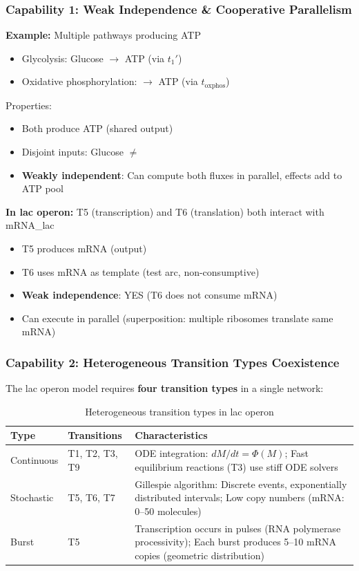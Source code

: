 \subsubsection{Capability 1: Weak Independence \& Cooperative Parallelism}

\textbf{Example:} Multiple pathways producing ATP
\begin{itemize}
    \item Glycolysis: Glucose $\to$ ATP (via $t_1'$)
    \item Oxidative phosphorylation:  $\to$ ATP (via $t_{\text{oxphos}}$)
\end{itemize}

Properties:
\begin{itemize}
    \item Both produce ATP (shared output)
    \item Disjoint inputs: Glucose $\neq$ 
    \item \textbf{Weakly independent}: Can compute both fluxes in parallel, effects add to ATP pool
\end{itemize}

\textbf{In lac operon:} T5 (transcription) and T6 (translation) both interact with mRNA\_lac
\begin{itemize}
    \item T5 produces mRNA (output)
    \item T6 uses mRNA as template (test arc, non-consumptive)
    \item \textbf{Weak independence}: YES (T6 does not consume mRNA)
    \item Can execute in parallel (superposition: multiple ribosomes translate same mRNA)
\end{itemize}

\subsubsection{Capability 2: Heterogeneous Transition Types Coexistence}

The lac operon model requires \textbf{four transition types} in a single network:

\begin{table}[htbp]
\centering
\caption{Heterogeneous transition types in lac operon}
\label{tab:transition-types}
\begin{tabular}{llp{6cm}}
\toprule
\textbf{Type} & \textbf{Transitions} & \textbf{Characteristics} \\
\midrule
Continuous & T1, T2, T3, T9 & ODE integration: $dM/dt = \Phi(M)$; Fast equilibrium reactions (T3) use stiff ODE solvers \\
Stochastic & T5, T6, T7 & Gillespie algorithm: Discrete events, exponentially distributed intervals; Low copy numbers (mRNA: 0--50 molecules) \\
Burst & T5 & Transcription occurs in pulses (RNA polymerase processivity); Each burst produces 5--10 mRNA copies (geometric distribution) \\
\bottomrule
\end{tabular}
\end{table}

